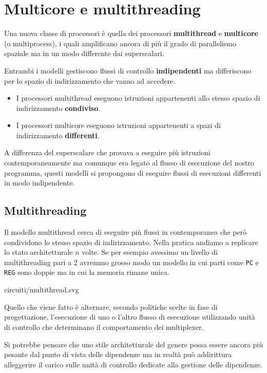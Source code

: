 \section{Multicore e multithreading}
Una nuova classe di processori è quella dei processori \textbf{multithread} e \textbf{multicore}
(o multiprocess), i quali amplificano ancora di più il grado di parallelismo spaziale ma in un modo
differente dai superscalari.

Entrambi i modelli gestiscono flussi di controllo \textbf{indipendenti} ma differiscono per lo
spazio di indirizzamento che vanno ad accedere.
\begin{itemize}
	\item I processori multithread eseguono istruzioni appartenenti allo stesso spazio di
	      indirizzamento \textbf{condiviso}.
	\item I processori multicore eseguono istruzioni appartenenti a spazi di indirizzamento
	      \textbf{differenti}.
\end{itemize}
A differenza del superscalare che provava a eseguire più istruzioni contemporaneamente ma comunque
era legato al flusso di esecuzione del nostro programma, questi modelli si propongono di eseguire
flussi di esecuzioni differenti in modo indipendente.

\subsection{Multithreading}
Il modello multithread cerca di eseguire più flussi in contemporanea che però condividono lo stesso
spazio di indirizzamento. Nella pratica andiamo a replicare lo stato architetturale $n$ volte. Se
per esempio avessimo un livello di multithreading pari a 2 avremmo grosso modo un modello in cui
parti come \verb|PC| e \verb|REG| sono doppie ma in cui la memoria rimane unica.
\begin{center}
	 {circuiti/multithread.svg}
\end{center}
Quello che viene fatto è alternare, secondo politiche scelte in fase di progettazione, l'esecuzione
di uno o l'altro flusso di esecuzione utilizzando unità di controllo che determinano il
comportamento dei multiplexer.

Si potrebbe pensare che uno stile architetturale del genere possa essere ancora più pesante dal
punto di vista delle dipendenze ma in realtà può addirittura alleggerire il carico sulle unità di
controllo dedicate alla gestione delle dipendenze.

